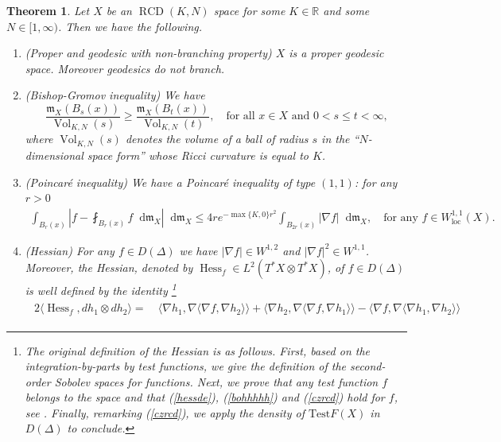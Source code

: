 \documentclass[11pt,reqno]{amsart}
\newtheorem{theorem}{Theorem}[section]
\theoremstyle{definition}
\numberwithin{equation}{section}
\newcommand{\di}{\mathop{}\!\mathrm{d}}
\newcommand{\meas}{\mathfrak{m}}
\DeclareMathOperator{\Hess}{Hess}
\DeclareMathOperator{\loc}{loc}
\DeclareMathOperator{\RCD}{RCD}
\DeclareMathOperator{\Vol}{Vol}
\begin{document}
\begin{theorem}\label{hessthem}
Let $X$ be an $\RCD(K, N)$ space for some $K \in \mathbb{R}$ and some $N \in [1, \infty)$. Then we have the following.
    \begin{enumerate}
        \item{(Proper and geodesic with non-branching property)} $X$ is a proper geodesic space. Moreover geodesics do not branch.
        \item{(Bishop-Gromov inequality)} We have 
    \begin{equation}\label{bg}
\frac{\meas_X(B_s(x))}{\Vol_{K, N}(s)} \ge \frac{\meas_X(B_t(x))}{\Vol_{K, N}(t)}, \quad \text{for all $x \in X$ and $0<s \le t<\infty$,}
\end{equation}
where $\Vol_{K, N}(s)$ denotes the volume of a ball of radius $s$ in the ``$N$-dimensional space form'' whose Ricci curvature is equal to $K$. 
\item{(Poincar\'e inequality)} We have a \textit{Poincar\'e inequality} of type $(1,1)$: for any $r>0$
\begin{align}\label{pi}
\int_{B_r(x)}\left| f-  \fint_{B_r(x)}f\di \meas_X \right| \di \meas_X \le 4re^{-\max\{K, 0\}r^2}\int_{B_{2r}(x)}|\nabla f| \di \meas_X, \quad \text{for any $f \in W^{1,1}_{\loc} (X)$.}
\end{align}
\item{(Hessian)}  For any $f \in D(\Delta)$ we have $|\nabla f| \in W^{1,2}$ and $|\nabla f|^2 \in W^{1,1}$. Moreover, the Hessian, denoted by $\Hess_f\in L^2(T^*X\otimes T^*X)$, of $f \in D(\Delta)$ is well defined by the identity \footnote{The original definition of the Hessian \cite[Definition 3.3.1]{Gigli1} is as follows. First, based on the integration-by-parts by test functions, we give the definition of the second-order Sobolev spaces for functions. Next, we prove that any test function $f$ belongs to the space and that (\ref{hessde}), (\ref{bohhhhh}) and (\ref{czrcd}) hold for $f$, see \cite[Theorem 3.3.8]{Gigli1}. Finally, remarking (\ref{czrcd}), we apply the density of $\mathrm{Test}F(X)$ in $D(\Delta)$ to conclude.}
\begin{align}
\begin{split}\label{hessde}	
	2\langle \Hess_f, dh_1 \otimes dh_2\rangle  = &\ \langle \nabla h_1, \nabla \langle \nabla f, \nabla h_2 \rangle\rangle 
	+  \langle \nabla h_2, \nabla \langle \nabla f, \nabla h_1 \rangle\rangle - \langle \nabla f, \nabla \langle \nabla h_1, \nabla h_2 \rangle\rangle 
	\end{split}
\end{align}

\end{enumerate}
\end{theorem}
\end{document}
